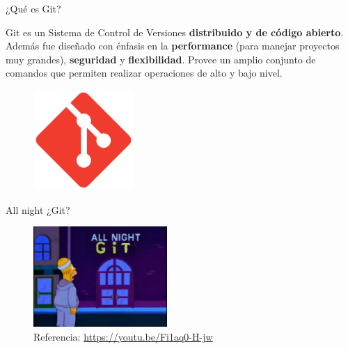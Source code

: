 \begin{frame}{¿Qué es Git?}

	\begin{block}{}
		Git es un Sistema de Control de Versiones \textbf{distribuido y de código abierto}.
        Además fue diseñado con énfasis en la \textbf{performance} (para manejar proyectos muy grandes), \textbf{seguridad} y \textbf{flexibilidad}.
        Provee un amplio conjunto de comandos que permiten realizar operaciones de alto y bajo nivel.
	\end{block}

    \begin{figure}[ht]
        \begin{center}
            \includegraphics[height=1.5in]{images/logo-git.pdf}
        \end{center}
    \end{figure}
\end{frame}

\begin{frame}{All night ¿Git?}

    \begin{figure}[ht]
        \begin{center}
            \includegraphics[height=1.5in]{images/homero-git.jpg}
        \end{center}
        \caption{Referencia: \url{https://youtu.be/Fi1aq0-H-jw}}
    \end{figure}
\end{frame}

